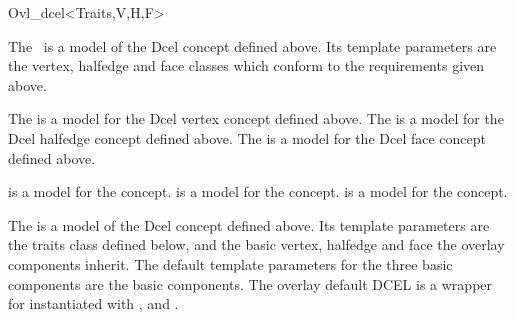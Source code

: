 
\ccRefPageBegin


\begin{ccRefClass}{Ovl_dcel<Traits,V,H,F>}

\ccDefinition

    The \ccClassTemplateName\ is a model of the Dcel concept
    defined above. Its template parameters are the vertex, halfedge and face
    classes which conform to the requirements given above.


\ccIsModel

The  is a model for the 
Dcel vertex concept defined above. 
The  is a
model for the Dcel halfedge concept defined above.
The  is a
model for the Dcel face concept defined above. 

 is a model for the  concept.
 is a model for the  concept.
 is a model for the  concept.



The  
is a model of the Dcel concept
defined above. Its template parameters are the traits class defined below, 
and the basic vertex, halfedge and face the overlay components inherit.
The default template parameters for the three basic components are the 
 basic components.
The overlay default DCEL is a wrapper for  instantiated 
with ,
 and 
.


\end{ccRefClass}
\ccRefPageEnd

